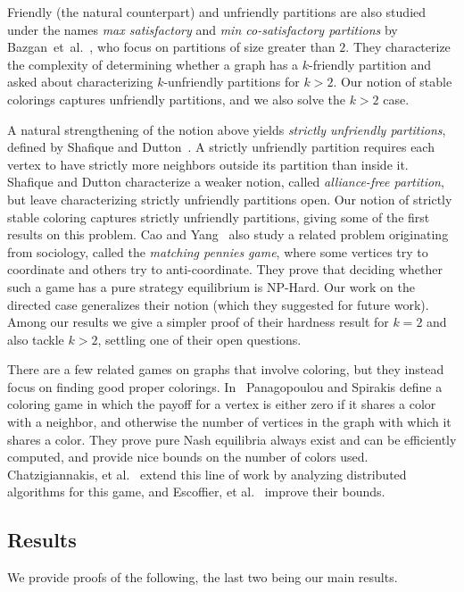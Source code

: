\documentclass{llncs}
\begin{document}
Friendly (the natural counterpart) and unfriendly partitions are also studied
under the names \emph{max satisfactory} and \emph{min co-satisfactory
partitions} by Bazgan~et~al.~\cite{BazganTV10}, who focus on partitions of
size greater than $2$.  They characterize the complexity of determining
whether a graph has a $k$-friendly partition and asked about characterizing
$k$-unfriendly partitions for $k > 2$.  Our notion of stable colorings captures
unfriendly partitions, and we also solve the $k>2$ case.


A natural strengthening of the notion above yields \emph{strictly
unfriendly partitions},  defined by Shafique and
Dutton~\cite{ShafiqueD09}.  A strictly unfriendly partition requires each
vertex to have strictly more neighbors outside its partition than inside it.
Shafique and Dutton characterize a weaker notion, called
\emph{alliance-free partition}, but leave characterizing strictly unfriendly
partitions open.  Our notion of strictly stable coloring captures 
strictly unfriendly partitions,
giving some of the first results on this problem.
Cao and Yang~\cite{CaoY12a} also study
a related problem originating from sociology, called the
\emph{matching pennies game},
where some
vertices try to coordinate and others try to anti-coordinate.  They prove that 
deciding whether such a game has a pure strategy equilibrium is NP-Hard.  Our
work on the directed case generalizes their notion (which they suggested for future work). 
 Among our results we give a simpler proof of their
hardness result for $k=2$ and also tackle  $k >2$, settling one of their open
questions.

There are a few related games on graphs that involve coloring, but they instead
focus on finding good proper colorings. In~\cite{PS08} Panagopoulou and
Spirakis define a coloring game in which the payoff for a vertex is either zero
if it shares a color with a neighbor, and otherwise the number of vertices in
the graph with which it shares a color. They prove pure Nash equilibria always
exist and can be efficiently computed, and provide nice bounds
on the number of colors used. Chatzigiannakis, et al.~\cite{CKPS10} extend this line of work
by analyzing distributed algorithms for this game, and
Escoffier, et al.~\cite{EGM12} improve their bounds. 


\subsection{Results}

We provide proofs of the following, the last two being our main results.
\end{document}
